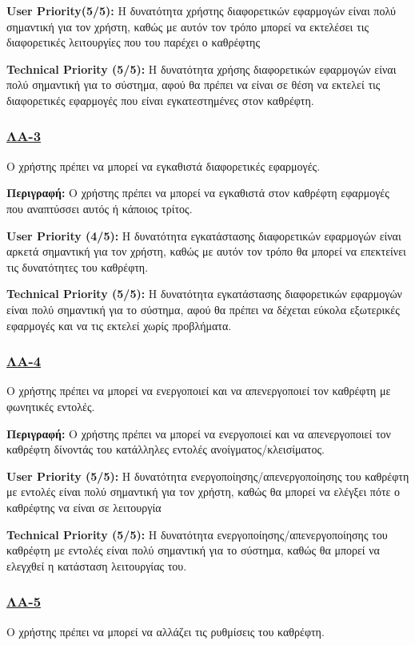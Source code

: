 \noindent\textbf{User Priority(5/5):} Η δυνατότητα χρήστης διαφορετικών εφαρμογών είναι πολύ σημαντική για τον χρήστη, καθώς με αυτόν τον τρόπο μπορεί να εκτελέσει τις διαφορετικές λειτουργίες που του παρέχει ο καθρέφτης

\noindent\textbf{Technical Priority (5/5):} Η δυνατότητα χρήσης διαφορετικών εφαρμογών είναι πολύ σημαντική για το σύστημα, αφού θα πρέπει να είναι σε θέση να εκτελεί τις διαφορετικές εφαρμογές που είναι εγκατεστημένες στον καθρέφτη.

\subsubsection{\underline{ΛΑ-3}}
\noindent Ο χρήστης πρέπει να μπορεί να εγκαθιστά διαφορετικές εφαρμογές.

\noindent\textbf{Περιγραφή:} Ο χρήστης πρέπει να μπορεί να εγκαθιστά στον καθρέφτη εφαρμογές που αναπτύσσει αυτός ή κάποιος τρίτος.

\noindent\textbf{User Priority (4/5):} Η δυνατότητα εγκατάστασης διαφορετικών εφαρμογών είναι αρκετά σημαντική για τον χρήστη, καθώς με αυτόν τον τρόπο θα μπορεί να επεκτείνει τις δυνατότητες του καθρέφτη.

\noindent\textbf{Technical Priority (5/5):} Η δυνατότητα εγκατάστασης διαφορετικών εφαρμογών είναι πολύ σημαντική για το σύστημα, αφού θα πρέπει να δέχεται εύκολα εξωτερικές εφαρμογές και να τις εκτελεί χωρίς προβλήματα. 

\subsubsection{\underline{ΛΑ-4}}
\noindent Ο χρήστης πρέπει να μπορεί να ενεργοποιεί και να απενεργοποιεί τον καθρέφτη με φωνητικές εντολές.

\noindent\textbf{Περιγραφή:} Ο χρήστης πρέπει να μπορεί να ενεργοποιεί και να απενεργοποιεί τον καθρέφτη δίνοντάς του κατάλληλες εντολές ανοίγματος/κλεισίματος.

\noindent\textbf{User Priority (5/5):} Η δυνατότητα ενεργοποίησης/απενεργοποίησης του καθρέφτη με εντολές είναι πολύ σημαντική για τον χρήστη, καθώς θα μπορεί να ελέγξει πότε ο καθρέφτης να είναι σε λειτουργία

\noindent\textbf{Technical Priority (5/5):} Η δυνατότητα ενεργοποίησης/απενεργοποίησης του καθρέφτη με εντολές είναι πολύ σημαντική για το σύστημα, καθώς θα μπορεί να ελεγχθεί η κατάσταση λειτουργίας του.

\subsubsection{\underline{ΛΑ-5}}
\noindent Ο χρήστης πρέπει να μπορεί να αλλάζει τις ρυθμίσεις του καθρέφτη.

